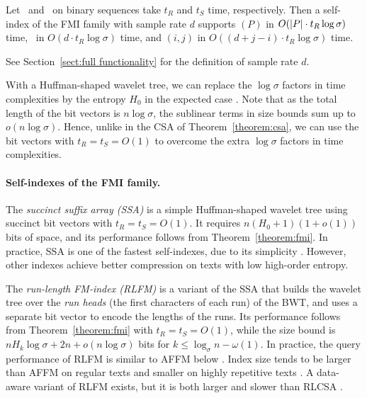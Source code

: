 \begin{theorem}\label{theorem:fmi}
Let \rank\ and \select\ on binary sequences take $t_{R}$ and $t_{S}$ time, respectively. Then a self-index of the FMI family with sample rate $d$ supports \find$(P)$ in $O(\lvert P \rvert \cdot t_{R} \log \sigma)$ time, \locate\ in $O(d \cdot t_{R} \log \sigma)$ time, and \extract$(i,j)$ in $O((d + j - i) \cdot t_{R} \log \sigma)$ time.
\end{theorem}

See Section~\ref{sect:full functionality} for the definition of sample rate $d$.

With a Huffman-shaped wavelet tree, we can replace the $\log \sigma$ factors in time complexities by the  entropy $H_{0}$ in the expected case \cite{Foschini2006}. Note that as the total length of the bit vectors is $n \log \sigma$, the sublinear terms in size bounds sum up to $o(n \log \sigma)$. Hence, unlike in the CSA of Theorem~\ref{theorem:csa}, we can use the bit vectors with $t_{R} = t_{S} = O(1)$ to overcome the extra $\log \sigma$ factors in time complexities.

\paragraph{Self-indexes of the FMI family.}

The \emph{succinct suffix array (SSA)} \cite{Maekinen2005} is a simple Huffman-shaped wavelet tree using succinct bit vectors with $t_{R} = t_{S} = O(1)$. It requires $n(H_{0}+1)(1+o(1))$ bits of space, and its performance follows from Theorem~\ref{theorem:fmi}. In practice, SSA is one of the fastest self-indexes, due to its simplicity \cite{Ferragina2009a}. However, other indexes achieve better compression on texts with low high-order entropy.

The \emph{run-length FM-index (RLFM)} \cite{Maekinen2005} is a variant of the SSA that builds the wavelet tree over the \emph{run heads} (the first characters of each run) of the BWT, and uses a separate bit vector to encode the lengths of the runs. Its performance follows from Theorem~\ref{theorem:fmi} with $t_{R} = t_{S} = O(1)$, while the size bound is $nH_{k} \log \sigma + 2n + o(n \log \sigma)$ bits for $k \le \log_{\sigma} n - \omega(1)$. In practice, the query performance of RLFM is similar to AFFM below \cite{Claude2008}. Index size tends to be larger than AFFM on regular texts \cite{Claude2008} and smaller on highly repetitive texts \cite{Siren2008}. A data-aware variant of RLFM exists, but it is both larger and slower than RLCSA \cite{Maekinen2010}.

